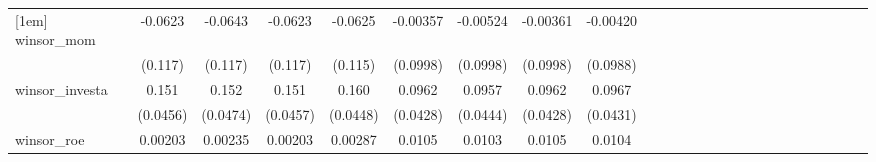 \begin{table}[htbp]
\begin{tabular}{l*{24}{c}}
[1em]
winsor\_mom          &     -0.0623         &     -0.0643         &     -0.0623         &     -0.0625         &    -0.00357         &    -0.00524         &    -0.00361         &    -0.00420         &                     &                     &                     &                     &                     &                     &                     &                     &                     &                     &                     &                     &                     &                     &                     &                     \\
                    &     (0.117)         &     (0.117)         &     (0.117)         &     (0.115)         &    (0.0998)         &    (0.0998)         &    (0.0998)         &    (0.0988)         &                     &                     &                     &                     &                     &                     &                     &                     &                     &                     &                     &                     &                     &                     &                     &                     \\
[1em]
winsor\_investa      &       0.151\sym{***}&       0.152\sym{***}&       0.151\sym{***}&       0.160\sym{***}&      0.0962\sym{**} &      0.0957\sym{**} &      0.0962\sym{**} &      0.0967\sym{**} &                     &                     &                     &                     &                     &                     &                     &                     &                     &                     &                     &                     &                     &                     &                     &                     \\
                    &    (0.0456)         &    (0.0474)         &    (0.0457)         &    (0.0448)         &    (0.0428)         &    (0.0444)         &    (0.0428)         &    (0.0431)         &                     &                     &                     &                     &                     &                     &                     &                     &                     &                     &                     &                     &                     &                     &                     &                     \\
[1em]
winsor\_roe          &     0.00203         &     0.00235         &     0.00203         &     0.00287         &      0.0105         &      0.0103         &      0.0105         &      0.0104         &                     &                     &                     &                     &                     &                     &                     &                     &                     &                     &                     &                     &                     &                     &                     &                     \\

\end{tabular}
\end{table}
